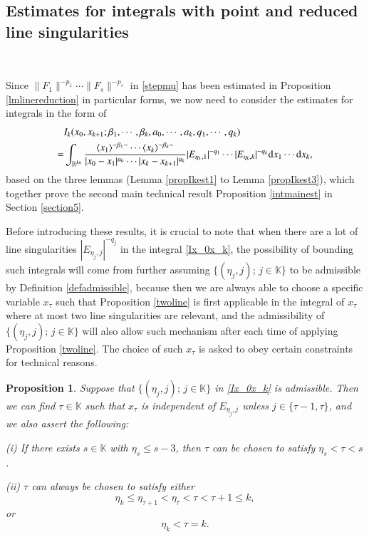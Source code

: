 \documentclass[11pt,reqno]{amsart}
\def\d{{\rm d}}
\newtheorem{proposition}[theorem]{Proposition}
\numberwithin{equation}{section}
\theoremstyle{definition}
\begin{document}
\subsection{Estimates for integrals with point and reduced line singularities}\label{section5.4}\

Since $\|F_1\|^{-p_1}\cdots\|F_s\|^{-p_s}$ in \eqref{stepmu} has been estimated in Proposition \ref{lmlinereduction} in particular forms, we now need to consider the estimates for integrals in the form of
\begin{equation}\label{Ix_0x_k}
	\begin{split}
		&I_k(x_0,x_{k+1};\beta_1,\cdots,\beta_k,a_0,\cdots,a_k,q_1,\cdots,q_k)\\
		=&\int_{\mathbb{R}^{kn}}\frac{\langle x_1\rangle^{-\beta_1-}\cdots\langle x_k\rangle^{-\beta_k-}}{|x_0-x_1|^{a_0}\cdots|x_k-x_{k+1}|^{a_k}}|E_{\eta_1,1}|^{-q_1}\cdots|E_{\eta_k,k}|^{-q_k}\d x_1\cdots \d x_k,
	\end{split}
\end{equation}
based on the three lemmas (Lemma \ref{propIkest1} to Lemma \ref{propIkest3}), which together prove the second main technical result Proposition \ref{intmainest} in Section \ref{section5}.

Before introducing these results, it is crucial to note that when there are a lot of line singularities $|E_{\eta_j,j}|^{-q_j}$ in the integral \eqref{Ix_0x_k}, the possibility of bounding such integrals  will come from further assuming $\{(\eta_j,j);\,j\in\mathbb{K}\}$ to be admissible by Definition \ref{defadmissible}, because then we are always able to choose a specific variable $x_\tau$ such that Proposition \ref{twoline} is first applicable in the integral of $x_\tau$ where at most two line singularities are relevant, and the admissibility of $\{(\eta_j,j);\,j\in\mathbb{K}\}$ will also allow such mechanism after each time of applying Proposition \ref{twoline}. The choice of such $x_\tau$ is asked to obey certain constraints for technical reasons.

\begin{proposition}\label{proad}
	Suppose that $\{(\eta_j,j);\,j\in\mathbb{K}\}$ in \eqref{Ix_0x_k} is admissible. Then we can find $\tau\in\mathbb{K}$ such that $x_{\tau}$ is independent of $E_{\eta_j,j}$ unless $j\in\{\tau-1,\tau\}$, and we also assert the following:
	
	\noindent (i) If there exists $s\in \mathbb{K}$ with $\eta_s \leq s-3$, then $\tau$ can be chosen to satisfy $\eta_s<\tau< s$.
	
	\noindent (ii) $\tau$ can always be chosen to satisfy either
	\begin{equation}\label{j_01r}
		\eta_k\leq\eta_{\tau+1}<\eta_\tau<\tau<\tau+1\leq k,
	\end{equation}
	or
	\begin{equation}\label{j_02r}
		\eta_k<\tau=k.
	\end{equation}		
\end{proposition}
\end{document}
